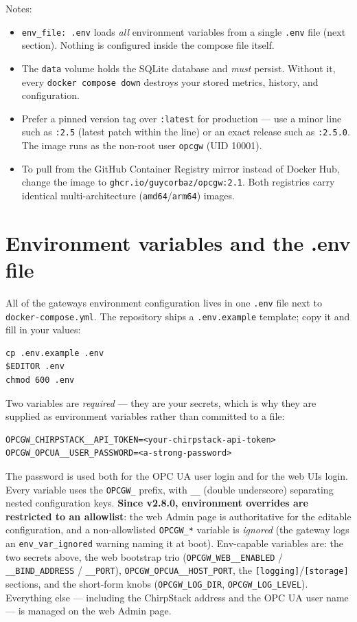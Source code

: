 Notes:

\begin{itemize}
\item
  \texttt{env\_file:\ .env} loads \emph{all} environment variables from a single \texttt{.env} file (next section). Nothing is configured inside the compose file itself.
\item
  The \texttt{data} volume holds the SQLite database and \emph{must} persist. Without it, every \texttt{docker\ compose\ down} destroys your stored metrics, history, and configuration.
\item
  Prefer a pinned version tag over \texttt{:latest} for production --- use a minor line such as \texttt{:2.5} (latest patch within the line) or an exact release such as \texttt{:2.5.0}. The image runs as the non-root user \texttt{opcgw} (UID 10001).
\item
  To pull from the GitHub Container Registry mirror instead of Docker Hub, change the image to \texttt{ghcr.io/guycorbaz/opcgw:2.1}. Both registries carry identical multi-architecture (\texttt{amd64}/\texttt{arm64}) images.
\end{itemize}

\section{Environment variables and the .env file}\label{sec-install-env}

All of the gateway\textquotesingle s environment configuration lives in one \texttt{.env} file next to \texttt{docker-compose.yml}. The repository ships a \texttt{.env.example} template; copy it and fill in your values:

\begin{lstlisting}
cp .env.example .env
$EDITOR .env
chmod 600 .env
\end{lstlisting}

Two variables are \emph{required} --- they are your secrets, which is why they are supplied as environment variables rather than committed to a file:

\begin{lstlisting}
OPCGW_CHIRPSTACK__API_TOKEN=<your-chirpstack-api-token>
OPCGW_OPCUA__USER_PASSWORD=<a-strong-password>
\end{lstlisting}

The password is used both for the OPC UA user login and for the web UI\textquotesingle s login. Every variable uses the \texttt{OPCGW\_} prefix, with \texttt{\_\_} (double underscore) separating nested configuration keys. \textbf{Since v2.8.0, environment overrides are restricted to an allowlist}: the web Admin page is authoritative for the editable configuration, and a non-allowlisted \texttt{OPCGW\_*} variable is \emph{ignored} (the gateway logs an \texttt{env\_var\_ignored} warning naming it at boot). Env-capable variables are: the two secrets above, the web bootstrap trio (\texttt{OPCGW\_WEB\_\_ENABLED} / \texttt{\_\_BIND\_ADDRESS} / \texttt{\_\_PORT}), \texttt{OPCGW\_OPCUA\_\_HOST\_PORT}, the \texttt{[logging]}/\texttt{[storage]} sections, and the short-form knobs (\texttt{OPCGW\_LOG\_DIR}, \texttt{OPCGW\_LOG\_LEVEL}). Everything else --- including the ChirpStack address and the OPC UA user name --- is managed on the web Admin page.

